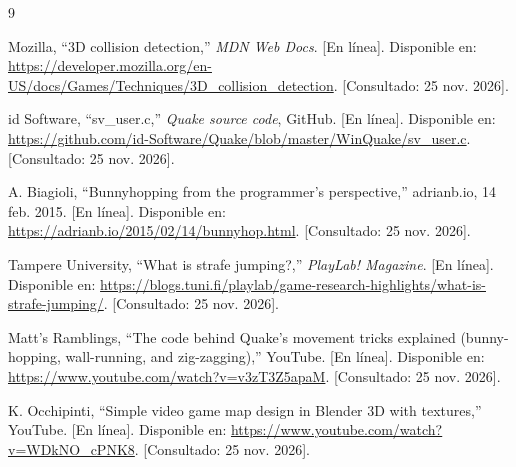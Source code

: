 \documentclass[12pt,a4paper]{article}
\begin{document}
\begingroup
\sloppy
\raggedright
\begin{thebibliography}{9}
\small

 Mozilla, ``3D collision detection,'' \emph{MDN Web Docs}.
[En línea]. Disponible en:
\url{https://developer.mozilla.org/en-US/docs/Games/Techniques/3D_collision_detection}.
[Consultado: 25 nov. 2026].

 id Software, ``sv\_user.c,'' \emph{Quake source code}, GitHub.
[En línea]. Disponible en:
\url{https://github.com/id-Software/Quake/blob/master/WinQuake/sv_user.c}.
[Consultado: 25 nov. 2026].

 A. Biagioli, ``Bunnyhopping from the programmer's perspective,''
adrianb.io, 14 feb. 2015. [En línea]. Disponible en:
\url{https://adrianb.io/2015/02/14/bunnyhop.html}.
[Consultado: 25 nov. 2026].

 Tampere University, ``What is strafe jumping?,''
\emph{PlayLab! Magazine}. [En línea]. Disponible en:
\url{https://blogs.tuni.fi/playlab/game-research-highlights/what-is-strafe-jumping/}.
[Consultado: 25 nov. 2026].

 Matt's Ramblings, ``The code behind Quake's movement tricks
explained (bunny-hopping, wall-running, and zig-zagging),'' YouTube. [En línea].
Disponible en: \url{https://www.youtube.com/watch?v=v3zT3Z5apaM}.
[Consultado: 25 nov. 2026].

 K. Occhipinti, ``Simple video game map design in Blender 3D with
textures,'' YouTube. [En línea]. Disponible en:
\url{https://www.youtube.com/watch?v=WDkNO_cPNK8}.
[Consultado: 25 nov. 2026].

\end{thebibliography}
\endgroup
\end{document}
